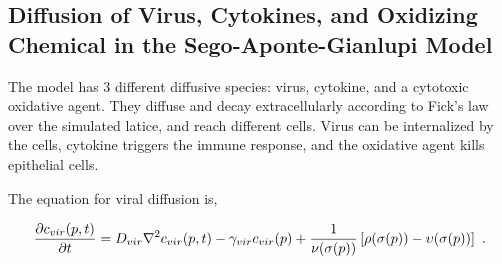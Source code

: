 

\subsection{Diffusion of Virus, Cytokines, and Oxidizing Chemical in the Sego-Aponte-Gianlupi Model}\label{sec:sego-aponte:diffusion}

The \sags model has 3 different diffusive species: virus, cytokine, and a cytotoxic oxidative agent. They
diffuse and decay extracellularly according to Fick's law over the simulated latice, 
and reach different cells.
Virus can be internalized by the cells, cytokine triggers the immune response, and the oxidative agent kills epithelial cells.

The equation for viral diffusion is,

\begin{equation}\label{eq:sego:diff:vir}
    \frac{\partial c_{vir}(p, t)}{\partial t} = D_{vir} \nabla^2c_{vir}(p, t) - \gamma_{vir}c_{vir}(p) + \frac{1}{\nu(\sigma(p))}\left[\rho(\sigma(p)) - \upsilon(\sigma(p))\right]\,\,.
\end{equation}

